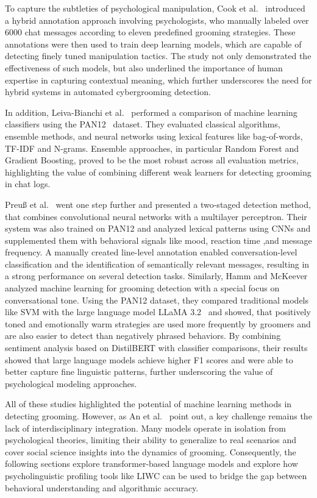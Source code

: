 To capture the subtleties of psychological manipulation, Cook et al.~\cite{cook2023protecting} introduced a hybrid annotation approach involving psychologists, who manually labeled over 6000 chat messages according to eleven predefined grooming strategies. These annotations were then used to train deep learning models, which are capable of detecting finely tuned manipulation tactics. The study not only demonstrated the effectiveness of such models, but also underlined the importance of human expertise in capturing contextual meaning, which further underscores the need for hybrid systems in automated cybergrooming detection.


In addition, Leiva-Bianchi et al.~\cite{leiva2024meta} performed a comparison of machine learning classifiers using the PAN12~\cite{inches2012pan} dataset. They evaluated classical algorithms, ensemble methods, and neural networks using lexical features like bag-of-words, TF-IDF and N-grams. Ensemble approaches, in particular Random Forest and Gradient Boosting, proved to be the most robust across all evaluation metrics, highlighting the value of combining different weak learners for detecting grooming in chat logs.

Preuß et al.~\cite{preuss2021automatically} went one step further and presented a two-staged detection method, that combines convolutional neural networks with a multilayer perceptron. Their system was also trained on PAN12 and analyzed lexical patterns using CNNs and supplemented them with behavioral signals like mood, reaction time ,and message frequency. A manually created line-level annotation enabled conversation-level classification and the identification of semantically relevant messages, resulting in a strong performance on several detection tasks. Similarly, Hamm and McKeever~\cite{hamm2025llms} analyzed machine learning for grooming detection with a special focus on conversational tone. Using the PAN12 dataset, they compared traditional models like SVM with the large language model LLaMA 3.2~\cite{llamapaper} and showed, that positively toned and emotionally warm strategies are used more frequently by groomers and are also easier to detect than negatively phrased behaviors. By combining sentiment analysis based on DistilBERT with classifier comparisons, their results showed that large language models achieve higher F1 scores and were able to better capture fine linguistic patterns, further underscoring the value of psychological modeling approaches.

All of these studies highlighted the potential of machine learning methods in detecting grooming. However, as An et al.~\cite{an2025cybergrooming} point out, a key challenge remains the lack of interdisciplinary integration. Many models operate in isolation from psychological theories, limiting their ability to generalize to real scenarios and cover social science insights into the dynamics of grooming. Consequently, the following sections explore transformer-based language models and explore how psycholinguistic profiling tools like LIWC can be used to bridge the gap between behavioral understanding and algorithmic accuracy.


